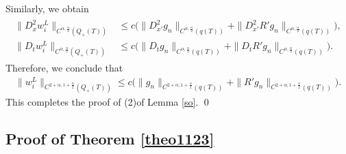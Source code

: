 \documentclass{amsart}
\numberwithin{equation}{section}
\newcommand {\al}{\alpha}
\begin{document}
Similarly, we obtain
\begin{align*}
\begin{split}
\| D_{x}^2 w_{i}^L \|_{C^{\al,\frac{\al}2}(Q_+(T))} &\leq c \Big( \| D^2_{x'} g_n \|_{C^{\al,\frac{\al}2}(q(T))} + \| D^2_{x'}R' g_n \|_{C^{\al,\frac{\al}2}(q(T))} \Big), \\ 
\| D_t w_{i}^L \|_{C^{\al,\frac{\al}2}(Q_+(T))} &\leq c \Big( \| D_t g_n \|_{C^{\al,\frac{\al}2}(q(T))} + \| D_t R' g_n \|_{C^{\al,\frac{\al}2}(q(T))} \Big).
\end{split}
\end{align*}
Therefore, we conclude that 
\begin{align*}
\| w_{i}^L \|_{C^{2 +\al, 1 +\frac{\al}2}(Q_+(T))} \leq c \Big( \| g_n \|_{C^{2+\al, 1 + \frac{\al}2}(q(T))} + \| R' g_n \|_{C^{2+\al, 1 + \frac{\al}2}(q(T))} \Big).
\end{align*}
This completes the proof  of (2)of Lemma \ref{so}.
\qed

 
\subsection{Proof of Theorem \ref{theo1123}  }\label{prooftheo1123}
 
\end{document}
